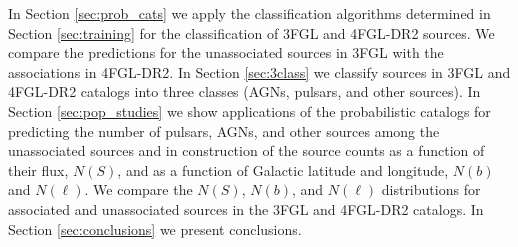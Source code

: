 In Section \ref{sec:prob_cats} we apply the classification algorithms determined in Section \ref{sec:training} for the classification of 3FGL and 4FGL-DR2 sources.
We compare the predictions for the unassociated sources in 3FGL with the associations in 4FGL-DR2.
In Section \ref{sec:3class} we classify sources in 3FGL and 4FGL-DR2 catalogs into three classes (AGNs, pulsars, and other sources).
In Section \ref{sec:pop_studies} we show applications of the probabilistic catalogs for predicting the number of pulsars, AGNs, and other sources among the unassociated sources and in construction of the source counts as a function of their flux, $N(S)$, and as a function of 
Galactic latitude and longitude, $N(b)$ and $N(\ell)$.
We compare the $N(S)$, $N(b)$, and $N(\ell)$ distributions for associated and unassociated sources in the 3FGL and 4FGL-DR2 catalogs.
In Section \ref{sec:conclusions} we present conclusions.


